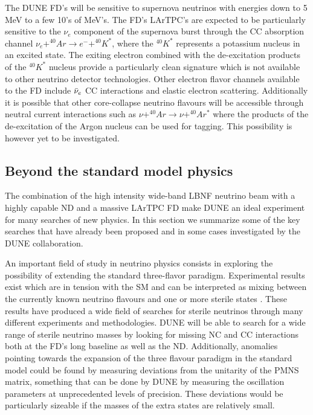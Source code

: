 The DUNE FD's will be sensitive to supernova neutrinos with energies down to 5 MeV to a few 10's of MeV's. The FD's LArTPC's are expected to be particularly sensitive to the $\nu_e$ component of the supernova burst through the CC absorption channel $\nu_e+^{40}Ar \rightarrow e^-+^{40}K^*$, where the $^{40}K^*$ represents a potassium nucleus in an excited state. The exiting electron combined with the de-excitation products of the $^{40}K^*$ nucleus provide a particularly clean signature which is not available to other neutrino detector technologies. Other electron flavor channels available to the FD include $\Bar{\nu}_e$ CC interactions and elastic electron scattering. Additionally it is possible that other core-collapse neutrino flavours will be accessible through neutral current interactions such as $\nu+^{40}Ar \rightarrow \nu+^{40}Ar^*$ where the products of the de-excitation of the Argon nucleus can be used for tagging. This possibility is however yet to be investigated. 

 


\subsection{Beyond the standard model physics}
\label{sec:BSM}

The combination of the high intensity wide-band LBNF neutrino beam with a highly capable ND and a massive LArTPC FD make DUNE an ideal experiment for many searches of new physics. In this section we summarize some of the key searches that have already been proposed and in some cases investigated by the DUNE collaboration.

An important field of study in neutrino physics consists in exploring the possibility of extending the standard three-flavor paradigm. Experimental results exist which are in tension with the SM and can be interpreted as mixing between the currently known neutrino flavours and one or more sterile states \cite{Gariazzo:2017fdh, Dentler:2018sju}. These results have produced a wide field of  searches for sterile neutrinos through many different experiments and methodologies. DUNE will be able to search for a wide range of sterile neutrino masses by looking for missing NC and CC interactions both at the FD's long baseline as well as the ND. Additionally, anomalies pointing towards the expansion of the three flavour paradigm in the standard model could be found by measuring deviations from the unitarity of the PMNS matrix, something that can be done by DUNE by measuring the oscillation parameters at unprecedented levels of precision. These deviations would be particularly sizeable if the masses of the extra states are relatively small. 

